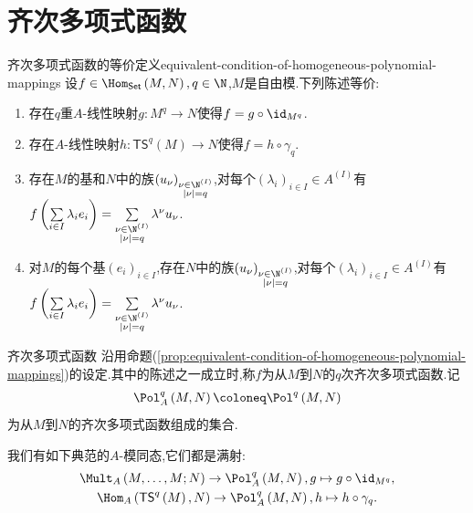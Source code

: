 \section{齐次多项式函数}

\begin{proposition}{齐次多项式函数的等价定义}{equivalent-condition-of-homogeneous-polynomial-mappings}
	设$f\in\Hom_{\mathsf{Set}}\left(M,N\right),q\in\N$,$M$是自由模.下列陈述等价:
	\begin{enumerate}
		\item 存在$q$重$A$-线性映射$g:M^{q}\to N$使得$f=g\circ\id_{M^{q}}$.
		\item 存在$A$-线性映射$h:\mathsf{TS}^{q}\left(M\right)\to N$使得$f=h\circ\gamma_{q}$.
		\item 存在$M$的基和$N$中的族$\left(u_{\nu}\right)_{\substack{\nu\in\N^{\left(I\right)}\\ \left|\nu\right|=q}}$,对每个$\left(\lambda_{i}\right)_{i\in I}\in A^{\left(I\right)}$有$	f\left(\sum\limits_{i\in I}\lambda_{i}e_{i}\right)=\sum\limits_{\substack{\nu\in\N^{\left(I\right)}\\ \left|\nu\right|=q}}\lambda^{\nu}u_{\nu}$.
		\item 对$M$的每个基$\left(e_{i}\right)_{i\in I}$,存在$N$中的族$\left(u_{\nu}\right)_{\substack{\nu\in\N^{\left(I\right)}\\ \left|\nu\right|=q}}$,对每个$\left(\lambda_{i}\right)_{i\in I}\in A^{\left(I\right)}$有$f\left(\sum\limits_{i\in I}\lambda_{i}e_{i}\right)=\sum\limits_{\substack{\nu\in\N^{\left(I\right)}\\ \left|\nu\right|=q}}\lambda^{\nu}u_{\nu}$.
	\end{enumerate}
\end{proposition}

\begin{definition}{齐次多项式函数}{}
	沿用命题(\cref{prop:equivalent-condition-of-homogeneous-polynomial-mappings})的设定.其中的陈述之一成立时,称$f$为从$M$到$N$的$q$次齐次多项式函数.记
	\begin{align*}
		\Pol_{A}^{q}\left(M,N\right)\coloneq\Pol^{q}\left(M,N\right)
	\end{align*}
	为从$M$到$N$的齐次多项式函数组成的集合.
\end{definition}

\begin{remark}{}{}
	我们有如下典范的$A$-模同态,它们都是满射:
	\begin{gather*}
		\Mult_{A}\left(M,\ldots,M;N\right)\to\Pol_{A}^{q}\left(M,N\right),g\mapsto g\circ\id_{M^{q}},\\
		\Hom_{A}\left(\mathsf{TS}^{q}\left(M\right),N\right)\to\Pol_{A}^{q}\left(M,N\right),h\mapsto h\circ\gamma_{q}.
	\end{gather*}
\end{remark}


